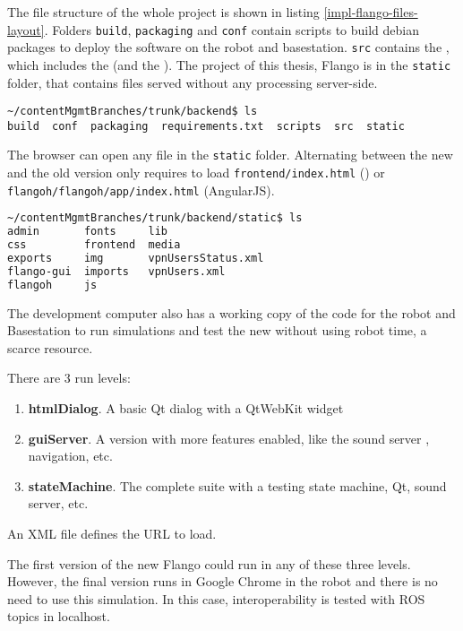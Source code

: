 The file structure of the whole project is shown in listing \ref{impl-flango-files-layout}.
Folders \texttt{build}, \texttt{packaging} and \texttt{conf} contain scripts to build debian packages to deploy the software on the robot and basestation.
\texttt{src} contains the \flangobe , which includes the \flangofe (and the \se).
The project of this thesis, Flango \cm is in the \texttt{static} folder, that contains files served without any processing server-side.

\begin{lstlisting}[columns=fixed,caption=Flango files layout, label=impl-flango-files-layout]
~/contentMgmtBranches/trunk/backend$ ls
build  conf  packaging  requirements.txt  scripts  src  static
\end{lstlisting}

The browser can open any file in the \texttt{static} folder.
Alternating between the new and the old version only requires to load \texttt{frontend/index.html} (\flash) or \texttt{flangoh/flangoh/app/index.html} (AngularJS).

\begin{lstlisting}[columns=fixed,language=bash,caption=Flango files layout, label=impl-flango-files-layout]
~/contentMgmtBranches/trunk/backend/static$ ls
admin       fonts     lib
css         frontend  media
exports     img       vpnUsersStatus.xml
flango-gui  imports   vpnUsers.xml
flangoh     js        
\end{lstlisting}

The development computer also has a working copy of the code for the robot and Basestation to run simulations and test the new \cm  without using robot time, a scarce resource.

There are 3 run levels:
\begin{enumerate}
\item \textbf{htmlDialog}. A basic Qt dialog with a QtWebKit widget
\item \textbf{guiServer}. A version with more features enabled, like the sound server , navigation, etc.
\item \textbf{stateMachine}. The complete suite with a testing state machine, Qt, sound server, etc.
\end{enumerate}

An \ac{XML} file defines the \ac{URL} to load.

The first version of the new Flango \cm could run in any of these three levels.
However, the final version runs in Google Chrome in the robot and there is no need to use this simulation.
In this case, interoperability is tested with \ac{ROS} topics in localhost.

